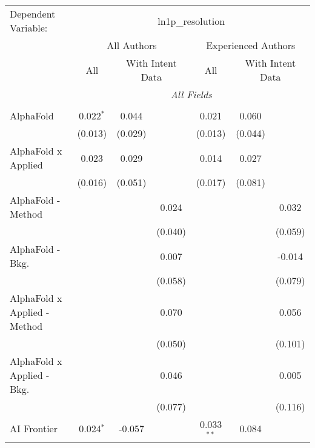 \begingroup
\centering
\begin{tabular}{lcccccc}
   \tabularnewline \midrule \midrule
   Dependent Variable: & \multicolumn{6}{c}{ln1p\_resolution}\\
 & \multicolumn{3}{c}{All Authors} & \multicolumn{3}{c}{Experienced Authors} \\
\cmidrule(lr){2-4} \cmidrule(lr){5-7}
 & \multicolumn{1}{c}{All} & \multicolumn{2}{c}{With Intent Data} & \multicolumn{1}{c}{All} & \multicolumn{2}{c}{With Intent Data} \\
\cmidrule(lr){2-2} \cmidrule(lr){3-4} \cmidrule(lr){5-5} \cmidrule(lr){6-7}
 & \multicolumn{6}{c}{\textit{All Fields}} \\ \\
   AlphaFold                      & 0.022$^{*}$ & 0.044   &              & 0.021        & 0.060   &   \\   
                                  & (0.013)     & (0.029) &              & (0.013)      & (0.044) &   \\   
   AlphaFold x Applied            & 0.023       & 0.029   &              & 0.014        & 0.027   &   \\   
                                  & (0.016)     & (0.051) &              & (0.017)      & (0.081) &   \\   
   AlphaFold - Method             &             &         & 0.024        &              &         & 0.032\\   
                                  &             &         & (0.040)      &              &         & (0.059)\\   
   AlphaFold - Bkg.               &             &         & 0.007        &              &         & -0.014\\   
                                  &             &         & (0.058)      &              &         & (0.079)\\   
   AlphaFold x Applied - Method   &             &         & 0.070        &              &         & 0.056\\   
                                  &             &         & (0.050)      &              &         & (0.101)\\   
   AlphaFold x Applied - Bkg.     &             &         & 0.046        &              &         & 0.005\\   
                                  &             &         & (0.077)      &              &         & (0.116)\\   
   AI Frontier                    & 0.024$^{*}$ & -0.057  &              & 0.033$^{**}$ & 0.084   &   \\   

\end{tabular}

